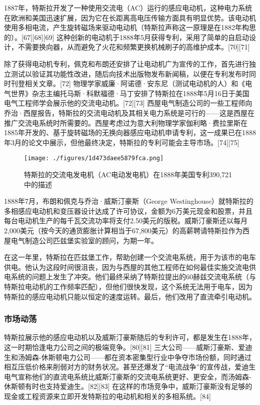 1887年，特斯拉开发了一种使用交流电（AC）运行的感应电动机，这种电力系统在欧洲和美国迅速扩展，因为它在长距离高电压传输方面具有明显优势。该电动机使用多相电流，产生旋转磁场来驱动电动机（特斯拉声称这一原理是在1882年构思的）。[67][68][69] 这种创新的电动机于1888年5月获得专利，采用了简单的自启动设计，不需要换向器，从而避免了火花和频繁更换机械刷子的高维护成本。[70][71]

除了获得电动机专利，佩克和布朗还安排了让电动机广为宣传的工作，首先进行独立测试以验证其功能性改进，随后向技术出版物发布新闻稿，以便在专利发布时同时刊登相关文章。[72] 物理学家威廉·阿诺德·安东尼（测试电动机的人）和《电气世界》杂志主编托马斯·科默福德·马丁安排了特斯拉在1888年5月16日于美国电气工程师学会展示他的交流电动机。[72][73] 西屋电气制造公司的一些工程师向乔治·西屋报告，特斯拉的交流电动机及其相关电力系统是可行的——这是西屋在推广交流电系统时所需要的。西屋考虑过为意大利物理学家伽利略·费拉里斯在1885年开发的、基于旋转磁场的无换向器感应电动机申请专利，这一成果已在1888年3月的论文中展示，但他最终决定，特斯拉的专利可能会主导市场。[74][75]
\begin{figure}[ht]
\centering
\texttt{[image: ./figures/1d473daee5879fca.png]}
\caption{特斯拉的交流电发电机（AC电动发电机）在1888年美国专利390,721中的描述} \label{fig_Tesla_7}
\end{figure}
1888年7月，布朗和佩克与乔治·威斯汀豪斯（George Westinghouse）就特斯拉的多相感应电动机和变压器设计达成了许可协议，金额为6万美元现金和股票，并且每台电动机生产的每千瓦交流功率将支付2.50美元的版税。威斯汀豪斯还以每月2,000美元（按今天的通货膨胀计算相当于67,800美元）的高薪聘请特斯拉作为西屋电气制造公司匹兹堡实验室的顾问，为期一年。

在这一年里，特斯拉在匹兹堡工作，帮助创建一个交流电系统，用于为该市的电车供电。他认为这段时间很沮丧，因为与西屋的其他工程师在如何最佳实施交流电供电系统的问题上发生了冲突。他们最终采纳了特斯拉提出的60赫兹交流电系统（与特斯拉电动机的工作频率匹配），但他们很快发现，这个系统无法用于电车，因为特斯拉的感应电动机只能以恒定的速度运转。最后，他们改用了直流牵引电动机。
\subsubsection{市场动荡}  
特斯拉展示他的感应电动机以及威斯汀豪斯随后的专利许可，都是发生在1888年，这一时期恰逢电力公司之间的极端竞争。[80][81] 三大公司——威斯汀豪斯、爱迪生和汤姆森-休斯顿电力公司——都在资本密集型行业中争夺市场份额，同时通过相互压低价格来削弱对方的财务状况。甚至还爆发了“电流战争”的宣传战，爱迪生电气宣称他们的直流电系统比威斯汀豪斯的交流电系统更好、更安全，而汤姆森-休斯顿有时也支持爱迪生。[82][83] 在这样的市场竞争中，威斯汀豪斯没有足够的现金或工程资源来立即开发特斯拉的电动机和相关的多相系统。[84]

